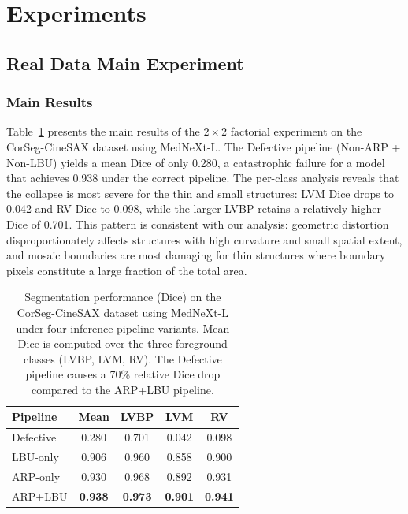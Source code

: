 \documentclass[10pt,twocolumn]{article}
\begin{document}
\section{Experiments}
\label{sec:experiments}

\subsection{Real Data Main Experiment}
\label{sec:real_exp}

\subsubsection{Main Results}

Table~\ref{tab:real_results} presents the main results of the $2\times2$ factorial experiment on the CorSeg-CineSAX dataset using MedNeXt-L.
The Defective pipeline (Non-ARP + Non-LBU) yields a mean Dice of only 0.280, a catastrophic failure for a model that achieves 0.938 under the correct pipeline.
The per-class analysis reveals that the collapse is most severe for the thin and small structures: LVM Dice drops to 0.042 and RV Dice to 0.098, while the larger LVBP retains a relatively higher Dice of 0.701.
This pattern is consistent with our analysis: geometric distortion disproportionately affects structures with high curvature and small spatial extent, and mosaic boundaries are most damaging for thin structures where boundary pixels constitute a large fraction of the total area.

\begin{table}[t]
\centering
\caption{Segmentation performance (Dice) on the CorSeg-CineSAX dataset using MedNeXt-L under four inference pipeline variants. Mean Dice is computed over the three foreground classes (LVBP, LVM, RV). The Defective pipeline causes a 70\% relative Dice drop compared to the ARP+LBU pipeline.}
\label{tab:real_results}
\begin{tabular}{lcccc}
\toprule
Pipeline & Mean & LVBP & LVM & RV \\
\midrule
Defective & 0.280 & 0.701 & 0.042 & 0.098 \\
LBU-only  & 0.906 & 0.960 & 0.858 & 0.900 \\
ARP-only  & 0.930 & 0.968 & 0.892 & 0.931 \\
ARP+LBU   & \textbf{0.938} & \textbf{0.973} & \textbf{0.901} & \textbf{0.941} \\
\bottomrule
\end{tabular}
\end{table}
\end{document}
